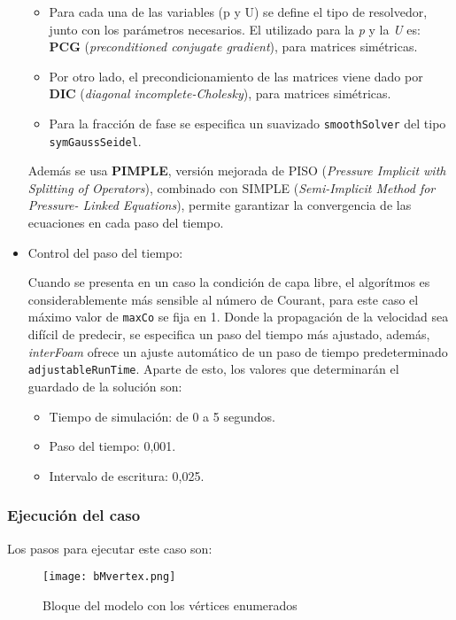 \begin{itemize}
  \begin{itemize}
  \item
    Para cada una de las variables (p y U) se define el tipo de
    resolvedor, junto con los parámetros necesarios. El utilizado para
    la \emph{p} y la \emph{U} es: \textbf{PCG} (\emph{preconditioned
    conjugate gradient}), para matrices simétricas.
  \item
    Por otro lado, el precondicionamiento de las matrices viene dado por
    \textbf{DIC} (\emph{diagonal incomplete-Cholesky}), para matrices
    simétricas.
  \item
    Para la fracción de fase se especifica un suavizado
    \texttt{smoothSolver} del tipo \texttt{symGaussSeidel}.
  \end{itemize}

  Además se usa \textbf{PIMPLE}, versión mejorada de PISO
  (\emph{Pressure Implicit with Splitting of Operators}), combinado con
  SIMPLE (\emph{Semi-Implicit Method for Pressure- Linked Equations}),
  permite garantizar la convergencia de las ecuaciones en cada paso del
  tiempo.
\item
  Control del paso del tiempo:

  Cuando se presenta en un caso la condición de capa libre, el
  algorítmos es considerablemente más sensible al número de Courant,
  para este caso el máximo valor de \texttt{maxCo} se fija en 1. Donde
  la propagación de la velocidad sea difícil de predecir, se especifica
  un paso del tiempo más ajustado, además, \emph{interFoam} ofrece un
  ajuste automático de un paso de tiempo predeterminado
  \texttt{adjustableRunTime}. Aparte de esto, los valores que
  determinarán el guardado de la solución son:

  \begin{itemize}
  \item
    Tiempo de simulación: de 0 a 5 segundos.
  \item
    Paso del tiempo: 0,001.
  \item
    Intervalo de escritura: 0,025.
  \end{itemize}
\end{itemize}

\subsubsection{Ejecución del caso}\label{header-n645}

Los pasos para ejecutar este caso son:

\begin{figure}
\centering
\texttt{[image: bMvertex.png]}
\caption{Bloque del modelo con los vértices enumerados}
\label{fig:bMvertex}
\end{figure}

